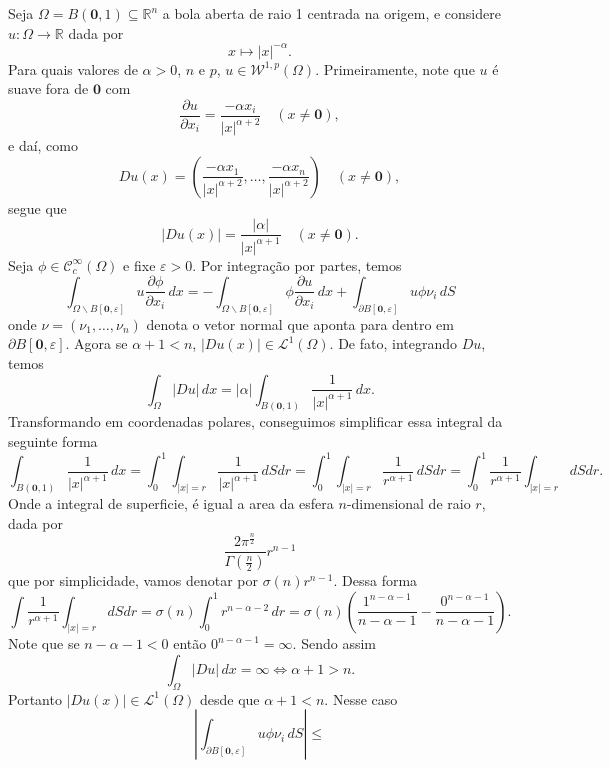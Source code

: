 \documentclass[a4paper, 11pt]{book}
\theoremstyle{definition}
\newcommand{\bR}{\mathbb{R}}
\newcommand{\cC}{\mathcal{C}}
\newcommand{\cL}{\mathcal{L}}
\newcommand{\cW}{\mathcal{W}}
\begin{document}
\begin{ex}
    Seja $\Omega = B(\mathbf{0},1) \subseteq \bR^n$ a bola aberta de raio 1 centrada na origem, e considere $u : \Omega \to \bR$ dada por
    \[
        x \mapsto |x|^{-\alpha}.
    \]
    Para quais valores de $\alpha > 0$, $n$ e $p$, $u \in \cW^{1,p}(\Omega)$.
    Primeiramente, note que $u$ é suave fora de $\mathbf{0}$ com
    \[
        \dfrac{\partial u}{\partial x_i} = \frac{-\alpha x_i}{|x|^{\alpha + 2}} \quad (x \neq \mathbf{0}),
    \]
    e daí, como
    \[
        Du(x) = \left(\frac{-\alpha x_1}{|x|^{\alpha + 2}},\dots,\frac{-\alpha x_n}{|x|^{\alpha + 2}}  \right) \quad (x \neq \mathbf{0}),
    \]
    segue que
    \[
        |Du(x)| = \frac{|\alpha|}{|x|^{\alpha + 1}} \quad (x \neq \mathbf{0}).
    \]
    Seja $\phi \in \cC^\infty_c(\Omega)$ e fixe $\varepsilon > 0$. Por integração por partes, temos
    \[
        \int_{\Omega \smallsetminus B[\mathbf{0}, \varepsilon]} u \dfrac{\partial \phi}{\partial x_i} \, dx = -\int_{\Omega \smallsetminus B[\mathbf{0}, \varepsilon]} \phi \dfrac{\partial u}{\partial x_i} \,dx + \int_{\partial B[\mathbf{0},\varepsilon]} u \phi \nu_i \,dS
    \]
    onde $\nu = (\nu_1,\dots,\nu_n)$ denota o vetor normal que aponta para dentro em $\partial B[\mathbf{0},\varepsilon]$.
    Agora se $\alpha + 1 < n$, $|Du(x)| \in \cL^1(\Omega)$.
    De fato, integrando $Du$, temos
    \[
        \int_\Omega |Du| \,dx = |\alpha|\int_{B(\mathbf{0},1)} \frac{1}{|x|^{\alpha+1}} \,dx.
    \]
    Transformando em coordenadas polares, conseguimos simplificar essa integral da seguinte forma
    \[
        \int_{B(\mathbf{0},1)} \frac{1}{|x|^{\alpha+1}} \,dx =  \int_0^1 \int_{|x| = r} \frac{1}{|x|^{\alpha + 1}} \,dS dr = \int_0^1 \int_{|x|= r} \frac{1}{r^{\alpha + 1}} \, dS dr = \int_0^1 \frac{1}{r^{\alpha+1}}  \int_{|x| = r} dS dr.
    \]
    Onde a integral de superficie, é igual a area da esfera $n$-dimensional de raio $r$, dada por
    \[
        \frac{2\pi^{\frac{n}{2}}}{\Gamma(\frac{n}{2})}r^{n-1}
    \]
    que por simplicidade, vamos denotar por $\sigma(n) r^{n-1}$. Dessa forma
    \[
        \int \frac{1}{r^{\alpha+1}}  \int_{|x| = r} dS dr = \sigma(n)\int_0^1 r^{n-\alpha-2} \,dr = \sigma(n)\left(\frac{1^{n-\alpha-1}}{n-\alpha -1} - \frac{0^{n-\alpha-1}}{n-\alpha-1}\right).
    \]
    Note que se $n - \alpha - 1 < 0$ então $0^{n-\alpha-1} = \infty$. Sendo assim
    \[
        \int_\Omega |Du| \, dx = \infty \iff \alpha + 1 > n.
    \]
    Portanto $|Du(x)| \in \cL^1(\Omega)$ desde que $\alpha + 1 < n$.
    Nesse caso
    \[
        \left| \int_{\partial B[\mathbf{0},\varepsilon]} u \phi \nu_i \,dS \right| \leqslant 
\]
\end{ex}
\end{document}
